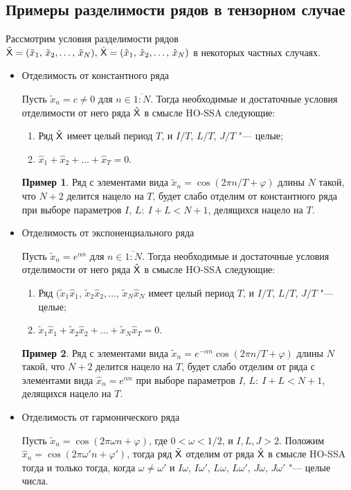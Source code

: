 \documentclass[specialist,
    substylefile = spbu_report.rtx,
    subf,href,colorlinks=true, 12pt]{disser}
\theoremstyle{plain}
\theoremstyle{definition}
\newtheorem{example}{Пример}[section]
\theoremstyle{remark}
\begin{document}
    \subsection{Примеры разделимости рядов в тензорном случае}\label{subsec:separation-example}
    Рассмотрим условия разделимости рядов $\tilde{\mathsf{X}}=(\tilde{x}_{1},\, \tilde{x}_{2},\ldots,\, \tilde{x}_{N}),\, \hat{\mathsf{X}}=
    (\hat{x}_{1},\, \hat{x}_{2},\ldots,\, \hat{x}_{N})$ в некоторых частных случаях.
    \begin{itemize}
        \item Отделимость от константного ряда

        Пусть $\tilde{x}_n=c\ne 0$ для $n\in\overline{1:N}$.
        Тогда необходимые и достаточные условия отделимости от него ряда $\hat{\mathsf{X}}$ в смысле HO-SSA следующие:
        \begin{enumerate}
            \item Ряд $\hat{\mathsf{X}}$ имеет целый период $T$, и $I/T$, $L/T$, $J/T$ "--- целые;
            \item $\hat{x}_{1}+\hat{x}_2+\ldots+\hat{x}_T=0$.
        \end{enumerate}
        \begin{example}
            Ряд с элементами вида $\tilde{x}_n=\cos(2\pi n / T + \varphi)$ длины $N$ такой, что $N+2$ делится нацело на
            $T$, будет слабо отделим от константного ряда при выборе параметров $I,\, L:\: I+L< N+1$, делящихся нацело на $T$.
        \end{example}
        \item Отделимость от экспоненциального ряда

        Пусть $\tilde{x}_n=e^{\alpha n}$ для $n\in\overline{1:N}$.
        Тогда необходимые и достаточные условия отделимости от него ряда $\hat{\mathsf{X}}$ в смысле HO-SSA следующие:
        \begin{enumerate}
            \item Ряд $(\tilde{x}_{1}\hat{x}_{1},\, \tilde{x}_{2}\hat{x}_{2},\ldots,\, \tilde{x}_{N}\hat{x}_{N}$
            имеет целый период $T$, и $I/T$, $L/T$, $J/T$ "--- целые;
            \item $\tilde{x}_{1}\hat{x}_{1}+\tilde{x}_{2}\hat{x}_2+\ldots+\tilde{x}_{N}\hat{x}_T=0$.
        \end{enumerate}
        \begin{example}
            Ряд с элементами вида $\tilde{x}_n=e^{-\alpha n}\cos(2\pi n / T + \varphi)$ длины $N$ такой, что $N+2$ делится нацело на
            $T$, будет слабо отделим от ряда с элементами вида $\hat{x}_n=e^{\alpha n}$ при выборе параметров $I,\, L:\: I+L< N+1$, делящихся нацело на $T$.
        \end{example}
        \item Отделимость от гармонического ряда

        Пусть $\tilde{x}_n=\cos(2\pi \omega n + \varphi)$, где $0 < \omega < 1/2$, и $I, L, J > 2$.
        Положим $\hat{x}_n=\cos(2\pi \omega' n + \varphi')$,
        тогда ряд $\tilde{\mathsf{X}}$ отделим от ряда $\hat{\mathsf{X}}$ в смысле HO-SSA тогда и только тогда, когда $\omega\ne\omega'$
        и $I\omega,\, I\omega',\, L\omega,\, L\omega',\, J\omega,\, J\omega'$ "--- целые числа.
    \end{itemize}
\end{document}
